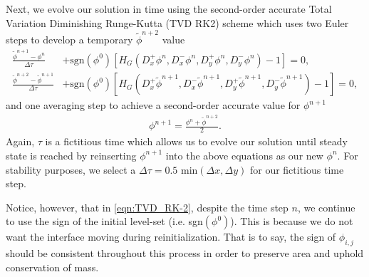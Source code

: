\documentclass[oneside,12pt,final]{/Applications/TeX/packages/ucthesis-CA2012}
\begin{document}
\begin{mainmatter}
Next, we evolve our solution in time using the second-order accurate Total Variation Diminishing Runge-Kutta (TVD RK2) scheme which uses two Euler steps to develop a temporary $\tilde{\phi}^{n+2}$ value
\begin{equation} \label{eqn:TVD_RK-2}
\begin{aligned}
\frac{\tilde{\phi}^{n+1} - \phi^n}{\Delta \tau} &+ \text{sgn}(\phi ^0)[H_G(D_x^+ \phi^n,D_x^- \phi^n,D_y^+ \phi^n,D_y^- \phi^n)-1] = 0,\\
\frac{\tilde{\phi}^{n+2} - \tilde{\phi}^{n+1}}{\Delta \tau} &+ \text{sgn}(\phi ^0)[H_G(D_x^+ \tilde{\phi}^{n+1},D_x^- \tilde{\phi}^{n+1},D_y^+ \tilde{\phi}^{n+1},D_y^- \tilde{\phi}^{n+1})-1] = 0,
\end{aligned}
\end{equation}
and one averaging step to achieve a second-order accurate value for $\phi^{n+1}$
\begin{equation}  
\begin{aligned}
\phi^{n+1} = \frac{\phi^n + \tilde{\phi}^{n+2}}{2}.
\end{aligned}
\end{equation}
Again, $\tau$ is a fictitious time which allows us to evolve our solution until steady state is reached by reinserting $\phi^{n+1}$ into the above equations as our new $\phi^n$. For stability purposes, we select a $\Delta \tau = 0.5$ min$(\Delta x, \Delta y)$ for our fictitious time step.

Notice, however, that in \eqref{eqn:TVD_RK-2}, despite the time step $n$, we continue to use the sign of the initial level-set (i.e. sgn$(\phi^0)$). This is because we do not want the interface moving during reinitialization. That is to say, the sign of $\phi_{i,j}$ should be consistent throughout this process in order to preserve area and uphold conservation of mass.


\end{mainmatter}
\end{document}
